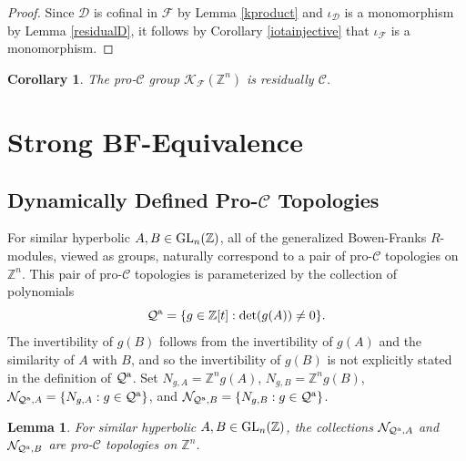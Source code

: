 \documentclass{amsart}
\theoremstyle{plain}
\newtheorem{lemma}[theorem]{Lemma}
\newtheorem{corollary}[theorem]{Corollary}
\theoremstyle{definition}
\theoremstyle{remark}
\begin{document}
\begin{proof} Since ${\mathcal D}$ is cofinal in ${\mathcal F}$ by Lemma \ref{kproduct} and $\iota_{\mathcal D}$ is a monomorphism by Lemma \ref{residualD}, it follows by Corollary \ref{iotainjective} that $\iota_{\mathcal F}$ is a monomorphism.
\end{proof}

\begin{corollary}\label{Znresfin} The pro-${\mathcal C}$ group ${\mathcal K}_{\mathcal F}({\mathbb Z}^n)$ is residually ${\mathcal C}$.
\end{corollary}



\section{Strong BF-Equivalence}

\subsection{Dynamically Defined Pro-${\mathcal C}$ Topologies}

For similar hyperbolic $A,B\in{\rm GL}_n({\mathbb Z})$, all of the generalized Bowen-Franks $R$-modules, viewed as groups, naturally correspond to a pair of pro-${\mathcal C}$ topologies on ${\mathbb Z}^n$. This pair of pro-${\mathcal C}$ topologies is parameterized by the collection of polynomials
\[ {\mathcal Q}^{\rm a} = \{ g\in {\mathbb Z}[t] : {\rm det}(g(A))\ne 0\}.\]
The invertibility of $g(B)$ follows from the invertibility of $g(A)$ and the similarity of $A$ with $B$, and so the invertibility of $g(B)$ is not explicitly stated in the definition of ${\mathcal Q}^{\rm a}$. Set $N_{g,A} = {\mathbb Z}^n g(A)$, $N_{g,B} = {\mathbb Z}^n g(B)$, ${\mathcal N}_{ {\mathcal Q}^{\rm a},A} = \{ N_{g,A}: g\in {\mathcal Q}^{\rm a} \}$, and ${\mathcal N}_{ {\mathcal Q}^{\rm a},B} = \{ N_{g,B}: g\in {\mathcal Q}^{\rm a}\}$.

\begin{lemma}\label{Qall} For similar hyperbolic $A,B\in {\rm GL}_n({\mathbb Z})$, the collections ${\mathcal N}_{ {\mathcal Q}^{\rm a},A}$ and ${\mathcal N}_{ {\mathcal Q}^{\rm a},B}$ are pro-${\mathcal C}$ topologies on ${\mathbb Z}^n$.
\end{lemma}
\end{document}
